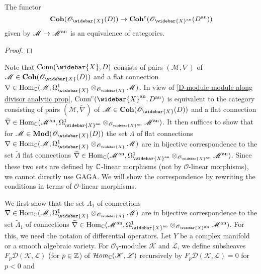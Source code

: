 \begin{lemma}\label{D-module module along divisor analytic prop}
The functor
\[\Coh(\mathscr{O}_{\widebar{X}}(D))\to\Coh^e(\mathscr{O}_{\widebar{X}^{\an}}(D^{\an}))\]
given by $\mathscr{M}\mapsto\mathscr{M}^{\mathrm{an}}$ is an equivalence of categories.
\end{lemma}
\begin{proof}

\end{proof}

Note that $\Conn(\widebar{X},D)$ consists of pairs $(\mathscr{M},\nabla)$ of $\mathscr{M}\in\Coh(\mathscr{O}_{\widebar{X}}(D))$ and a flat connection $\nabla\in\Hom_{\C}(\mathscr{M},\Omega_{\widebar{X}}^1\otimes_{\mathscr{O}_{\widebar{X}}}\mathscr{M})$. In view of \cref{D-module module along divisor analytic prop}, $\Conn^e(\widebar{X}^{\an},D^{\an})$ is equivalent to the category consisting of pairs $(\mathscr{M},\widetilde{\nabla})$ of $\mathscr{M}\in\Coh(\mathscr{O}_{\widebar{X}}(D))$ and a flat connection $\widetilde{\nabla}\in\Hom_{\C}(\mathscr{M}^{\an},\Omega_{\widebar{X}^\an}^1\otimes_{\mathscr{O}_{\widebar{X}^{\an}}}\mathscr{M}^{\an})$. It then suffices to show that for $\mathscr{M}\in\Mod(\mathscr{O}_{\widebar{X}}(D))$ the set $\Lambda$ of flat connections $\nabla\in\Hom_{\C}(\mathscr{M},\Omega_{\widebar{X}}^1\otimes_{\mathscr{O}_{\widebar{X}}}\mathscr{M})$ are in bijective correspondence to the set $\tilde{\Lambda}$ flat connections $\widetilde{\nabla}\in\Hom_{\C}(\mathscr{M}^{\an},\Omega_{\widebar{X}^\an}^1\otimes_{\mathscr{O}_{\widebar{X}^{\an}}}\mathscr{M}^{\an})$. Since these two sets are defined by $\mathbb{C}$-linear morphisms (not by $\mathscr{O}$-linear morphisms), we cannot directly use GAGA. We will show the correspondence by rewriting the conditions in terms of $\mathscr{O}$-linear morphisms.\par
We first show that the set $\Lambda_1$ of connections $\nabla\in\Hom_{\C}(\mathscr{M},\Omega_{\widebar{X}}^1\otimes_{\mathscr{O}_{\widebar{X}}}\mathscr{M})$ are in bijective correspondence to the set $\tilde{\Lambda}_1$ of connections $\widetilde{\nabla}\in\Hom_{\C}(\mathscr{M}^{\an},\Omega_{\widebar{X}^\an}^1\otimes_{\mathscr{O}_{\widebar{X}^{\an}}}\mathscr{M}^{\an})$. For this, we need the notaion of differential operators. Let $Y$ be a complex manifold or a smooth algebraic variety. For $\mathscr{O}_Y$-modules $\mathscr{K}$ and $\mathscr{L}$, we define subsheaves $F_p\mathscr{D}(\mathscr{K},\mathscr{L})$ (for $p\in\mathbb{Z}$) of $\operatorname{\mathcal{H}\hspace*{-0.4pt}\textit{om}\hspace{0.5pt}}_{\mathbb{C}}(\mathscr{K},\mathscr{L})$ recursively by $F_p\mathscr{D}(\mathscr{K},\mathscr{L})=0$ for $p<0$ and
